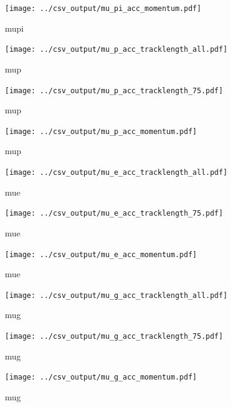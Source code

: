 \begin{figure}[htp]
\centering
\texttt{[image: ../csv\_output/mu\_pi\_acc\_momentum.pdf]}
\caption{mupi}
\label{fig:mu_pi}
\end{figure}

\begin{figure}[htp]
\centering
\texttt{[image: ../csv\_output/mu\_p\_acc\_tracklength\_all.pdf]}
\caption{mup}
\label{fig:mu_p}
\end{figure}

\begin{figure}[htp]
\centering
\texttt{[image: ../csv\_output/mu\_p\_acc\_tracklength\_75.pdf]}
\caption{mup}
\label{fig:mu_p}
\end{figure}

\begin{figure}[htp]
\centering
\texttt{[image: ../csv\_output/mu\_p\_acc\_momentum.pdf]}
\caption{mup}
\label{fig:mu_p}
\end{figure}

\begin{figure}[htp]
\centering
\texttt{[image: ../csv\_output/mu\_e\_acc\_tracklength\_all.pdf]}
\caption{mue}
\label{fig:mu_e}
\end{figure}

\begin{figure}[htp]
\centering
\texttt{[image: ../csv\_output/mu\_e\_acc\_tracklength\_75.pdf]}
\caption{mue}
\label{fig:mu_e}
\end{figure}

\begin{figure}[htp]
\centering
\texttt{[image: ../csv\_output/mu\_e\_acc\_momentum.pdf]}
\caption{mue}
\label{fig:mu_e}
\end{figure}

\begin{figure}[htp]
\centering
\texttt{[image: ../csv\_output/mu\_g\_acc\_tracklength\_all.pdf]}
\caption{mug}
\label{fig:mu_g}
\end{figure}

\begin{figure}[htp]
\centering
\texttt{[image: ../csv\_output/mu\_g\_acc\_tracklength\_75.pdf]}
\caption{mug}
\label{fig:mu_g}
\end{figure}

\begin{figure}[htp]
\centering
\texttt{[image: ../csv\_output/mu\_g\_acc\_momentum.pdf]}
\caption{mug}
\label{fig:mu_g}
\end{figure}

